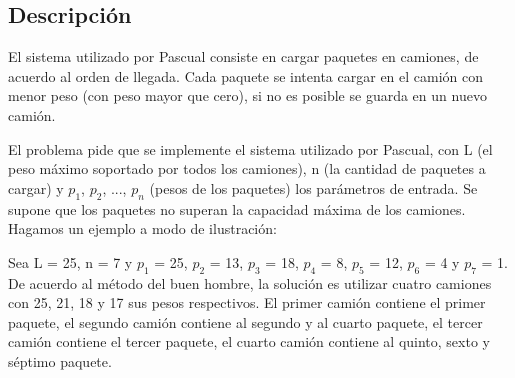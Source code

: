\subsection{Descripci\'on}


El sistema utilizado por Pascual consiste en cargar paquetes en camiones, de acuerdo al orden de llegada. Cada paquete se intenta cargar en el cami\'on con menor peso (con peso mayor que cero), si no es posible se guarda en un nuevo cami\'on.

El problema pide que se implemente el sistema utilizado por Pascual, con L (el peso m\'aximo soportado por todos los camiones), n (la cantidad de paquetes a cargar) y $p_1$, $p_2$, ..., $p_n$ (pesos de los paquetes) los par\'ametros de entrada.  Se supone que los paquetes no superan la capacidad m\'axima de los camiones.
Hagamos un ejemplo a modo de ilustraci\'on:

Sea L = 25, n = 7 y $p_1$ = 25, $p_2$ = 13, $p_3$ = 18, $p_4$ = 8, $p_5$ = 12, $p_6$ = 4 y $p_7$ = 1.
De acuerdo al m\'etodo del buen hombre, la soluci\'on es utilizar cuatro camiones con 25, 21, 18 y 17 sus pesos respectivos. El primer cami\'on contiene el primer paquete, el segundo cami\'on contiene al segundo y al cuarto paquete, el tercer cami\'on contiene el tercer paquete, el cuarto cami\'on contiene al quinto, sexto y s\'eptimo paquete.

